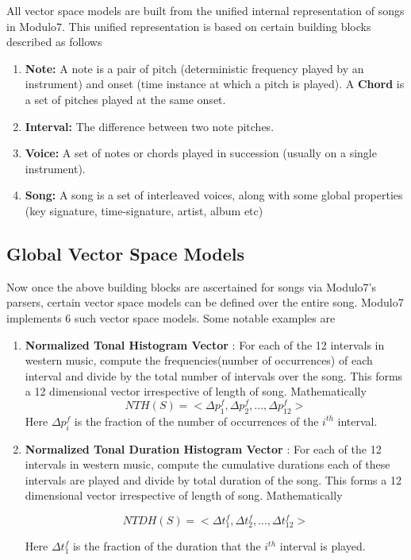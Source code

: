 \documentclass{article}
\begin{document}
All vector space models are built from the unified internal representation of songs in Modulo7. This unified representation is based on certain building blocks described as follows

\begin{enumerate}
\item \textbf{Note:} A note is a pair of pitch (deterministic frequency played by an instrument) and onset (time instance at which a pitch is played). A \textbf{Chord} is a set of pitches played at the same onset. 
\item \textbf{Interval:} The difference between two note pitches.
\item \textbf{Voice:} A set of notes or chords played in succession (usually on a single instrument).
\item \textbf{Song: } A song is a set of interleaved voices, along with some global properties (key signature, time-signature, artist, album etc)
\end{enumerate}

\subsection{Global Vector Space Models} \label{globalvectorspace}

Now once the above building blocks are ascertained for songs via Modulo7's parsers, certain vector space models can be defined over the entire song. Modulo7 implements 6 such vector space models. Some notable examples are 

\begin{enumerate}
\item \textbf{Normalized Tonal Histogram Vector} : For each of the 12 intervals in western music, compute the frequencies(number of occurrences) of each interval and divide by the total number of intervals over the song. This forms a 12 dimensional vector irrespective of length of song. Mathematically
\begin{equation}
NTH(S) = <\Delta p^f_1, \Delta p^f_2, ... , \Delta p^f_{12}>
\end{equation}
Here $\Delta p^f_i$ is the fraction of the number of occurrences of the $i^{th}$ interval.
\item \textbf{Normalized Tonal Duration Histogram Vector} : For each of the 12 intervals in western music, compute the cumulative durations each of these intervals are played and divide by total duration of the song. This forms a 12 dimensional vector irrespective of length of song. Mathematically 

\begin{equation}
NTDH(S) = <\Delta t^f_1, \Delta t^f_2, ... , \Delta t^f_{12}>
\end{equation}

Here $\Delta t^f_1$ is the fraction of the duration that the  $i^{th}$ interval is played.  
 
\end{enumerate}
\end{document}
